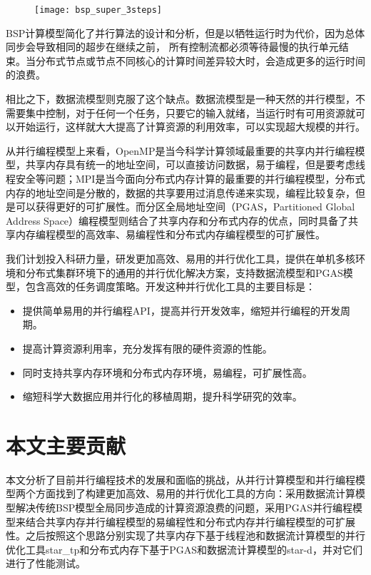 \begin{figure}[!htbp]
    \centering
    \texttt{[image: bsp\_super\_3steps]}
    \label{fig:bsp_super_3steps}
\end{figure}

BSP计算模型简化了并行算法的设计和分析，但是以牺牲运行时为代价，因为总体同步会导致相同的超步在继续之前， 所有控制流都必须等待最慢的执行单元结束。当分布式节点或节点不同核心的计算时间差异较大时，会造成更多的运行时间的浪费。

相比之下，数据流模型则克服了这个缺点。数据流模型是一种天然的并行模型，不需要集中控制，对于任何一个任务，只要它的输入就绪，当运行时有可用资源就可以开始运行，这样就大大提高了计算资源的利用效率，可以实现超大规模的并行。

从并行编程模型上来看，OpenMP是当今科学计算领域最重要的共享内并行编程模型，共享内存具有统一的地址空间，可以直接访问数据，易于编程，但是要考虑线程安全等问题；MPI是当今面向分布式内存计算的最重要的并行编程模型，分布式内存的地址空间是分散的，数据的共享要用过消息传递来实现，编程比较复杂，但是可以获得更好的可扩展性。而分区全局地址空间（PGAS，Partitioned Global Address Space）编程模型则结合了共享内存和分布式内存的优点，同时具备了共享内存编程模型的高效率、易编程性和分布式内存编程模型的可扩展性。

我们计划投入科研力量，研发更加高效、易用的并行优化工具，提供在单机多核环境和分布式集群环境下的通用的并行优化解决方案，支持数据流模型和PGAS模型，包含高效的任务调度策略。开发这种并行优化工具的主要目标是：

\begin{itemize}
	\item 提供简单易用的并行编程API，提高并行开发效率，缩短并行编程的开发周期。
	\item 提高计算资源利用率，充分发挥有限的硬件资源的性能。
	\item 同时支持共享内存环境和分布式内存环境，易编程，可扩展性高。
	\item 缩短科学大数据应用并行化的移植周期，提升科学研究的效率。
\end{itemize}

\section{本文主要贡献}

本文分析了目前并行编程技术的发展和面临的挑战，从并行计算模型和并行编程模型两个方面找到了构建更加高效、易用的并行优化工具的方向：采用数据流计算模型解决传统BSP模型全局同步造成的计算资源浪费的问题，采用PGAS并行编程模型来结合共享内存并行编程模型的易编程性和分布式内存并行编程模型的可扩展性。之后按照这个思路分别实现了共享内存下基于线程池和数据流计算模型的并行优化工具star\_tp和分布式内存下基于PGAS和数据流计算模型的star-d，并对它们进行了性能测试。

